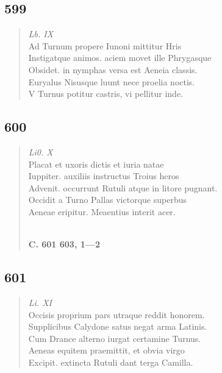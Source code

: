 \documentclass[11pt, a4paper]{report}
\begin{document}
            \subsection*{599}
      \begin{verse}
      \textit{Lb. IX} \\ Ad Turnum propere Iunoni mittitur Hris \\ Instigatque animos. aciem movet ille Phrygasque \\ Obsidet. in nymphas versa est Aeneia classis. \\ Euryalus Nisusque luunt nece proelia noctis. \\ V Turnus potitur castris, vi pellitur inde. \\ 
      \end{verse}
  
            \subsection*{600}
      \begin{verse}
      \textit{Li0. X} \\ Placat et uxoris dictis et iuria natae \\ Iuppiter. auxiliis instructus Troius heros \\ Advenit. occurrunt Rutuli atque in litore pugnant. \\ Occidit a Turno Pallas victorque superbus \\ Aeneae eripitur. Meaentius interit acer. \\ 
        ﻿\pagebreak 
    \begin{center} \textbf{C. 601 603, 1—2} \end{center} \marginpar{[86]} 
      \end{verse}
  
            \subsection*{601}
      \begin{verse}
      \textit{Li. XI} \\ Occisis proprium pars utraque reddit honorem. \\ Supplicibus Calydone satus negat arma Latinis. \\ Cum Drance alterno iurgat certamine Turnus. \\ Aeneas equitem praemittit, et obvia virgo \\ Excipit. extincta Rutuli dant terga Camilla. \\ 
      \end{verse}
  
\end{document}
